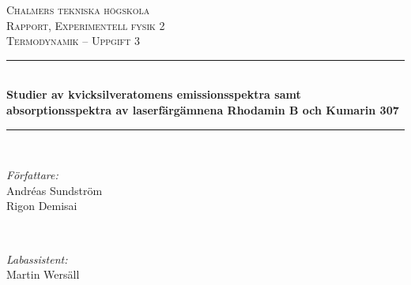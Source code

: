 \renewcommand{\thefootnote}{\fnsymbol{footnote}}

\newcommand{\andsunds}{andsunds@student.chalmers.se}
\newcommand{\rigon}{rigon@student.chalmers.se}



\begin{titlepage}

\newcommand{\HRule}{\rule{\linewidth}{0.5mm}} %

\center %
 

\textsc{\huge Chalmers tekniska högskola}\\[1.5cm] %
\textsc{\Large Rapport, Experimentell fysik 2}\\[0.2cm] %
\textsc{\large Termodynamik -- Uppgift 3 }\\[0.5cm] %


\HRule \\[0.4cm]
{ \LARGE \bfseries 
Studier av kvicksilveratomens emissionsspektra samt absorptionsspektra av laserfärgämnena Rhodamin B och Kumarin 307
}\\[0.4cm] %
\HRule \\[1.5cm]
 

\begin{minipage}{0.4\textwidth}
\begin{flushleft} \large
\emph{Författare:}\\
Andréas Sundström\footnotemark{} \\
Rigon Demisai\footnotemark{} 
\end{flushleft}
\end{minipage}
~
\begin{minipage}{0.4\textwidth}
\begin{flushright} \large
\emph{Labassistent:} \\
Martin Wersäll
\end{flushright}
\end{minipage}\\[3cm]


\end{titlepage}
